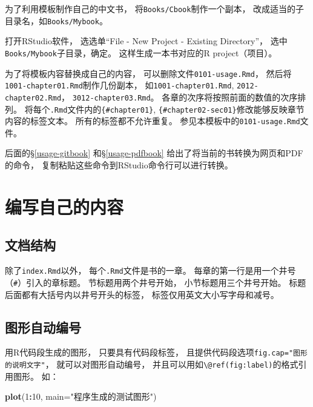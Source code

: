 \documentclass[]{book}
\newenvironment{Shaded}{\begin{snugshade}}{\end{snugshade}}
\newcommand{\DataTypeTok}[1]{\textcolor[rgb]{0.13,0.29,0.53}{#1}}
\newcommand{\DecValTok}[1]{\textcolor[rgb]{0.00,0.00,0.81}{#1}}
\newcommand{\KeywordTok}[1]{\textcolor[rgb]{0.13,0.29,0.53}{\textbf{#1}}}
\newcommand{\NormalTok}[1]{#1}
\newcommand{\OperatorTok}[1]{\textcolor[rgb]{0.81,0.36,0.00}{\textbf{#1}}}
\newcommand{\StringTok}[1]{\textcolor[rgb]{0.31,0.60,0.02}{#1}}
\theoremstyle{definition}
\theoremstyle{definition}
\theoremstyle{definition}
\theoremstyle{remark}
\begin{document}
为了利用模板制作自己的中文书， 将\texttt{Books/Cbook}制作一个副本，
改成适当的子目录名，如\texttt{Books/Mybook}。

打开RStudio软件， 选选单``File - New Project - Existing Directory''，
选中\texttt{Books/Mybook}子目录，确定。 这样生成一本书对应的R
project（项目）。

为了将模板内容替换成自己的内容， 可以删除文件\texttt{0101-usage.Rmd}，
然后将\texttt{1001-chapter01.Rmd}制作几份副本，
如\texttt{1001-chapter01.Rmd}, \texttt{2012-chapter02.Rmd}，
\texttt{3012-chapter03.Rmd}。 各章的次序将按照前面的数值的次序排列。
将每个\texttt{.Rmd}文件内的\texttt{\{\#chapter01\}},
\texttt{\{\#chapter02-sec01\}}修改能够反映章节内容的标签文本。
所有的标签都不允许重复。 参见本模板中的\texttt{0101-usage.Rmd}文件。

后面的§\ref{usage-gitbook} 和§\ref{usage-pdfbook}
给出了将当前的书转换为网页和PDF的命令，
复制粘贴这些命令到RStudio命令行可以进行转换。

\hypertarget{usage-writing}{%
\section{编写自己的内容}\label{usage-writing}}

\hypertarget{usage-writing-struct}{%
\subsection{文档结构}\label{usage-writing-struct}}

除了\texttt{index.Rmd}以外， 每个\texttt{.Rmd}文件是书的一章。
每章的第一行是用一个井号（\texttt{\#}）引入的章标题。
节标题用两个井号开始， 小节标题用三个井号开始。
标题后面都有大括号内以井号开头的标签， 标签仅用英文大小写字母和减号。

\hypertarget{usage-writing-fig}{%
\subsection{图形自动编号}\label{usage-writing-fig}}

用R代码段生成的图形， 只要具有代码段标签，
且提供代码段选项\texttt{fig.cap="图形的说明文字"}，
就可以对图形自动编号，
并且可以用如\texttt{\textbackslash{}@ref(fig:label)}的格式引用图形。
如：

\begin{Shaded}
\begin{Highlighting}[]
\KeywordTok{plot}\NormalTok{(}\DecValTok{1}\OperatorTok{:}\DecValTok{10}\NormalTok{, }\DataTypeTok{main=}\StringTok{"程序生成的测试图形"}\NormalTok{)}
\end{Highlighting}
\end{Shaded}
\end{document}
